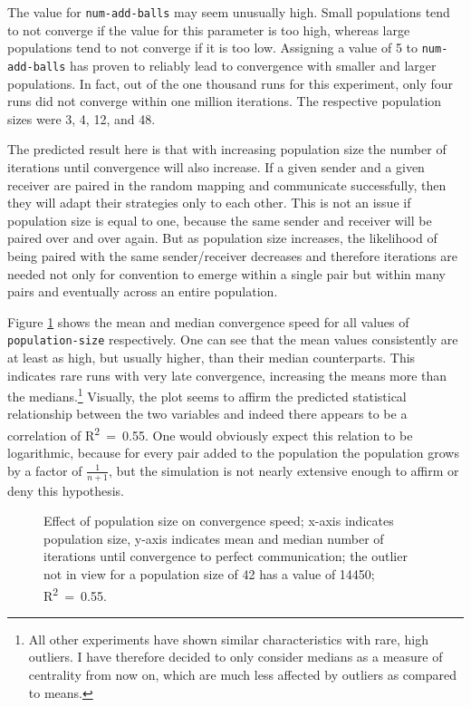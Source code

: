 \documentclass[
	DIV=calc,
	BCOR=0mm,
	pagesize,
]{scrartcl}
\newcommand{\code}[1]{\texttt{#1}}
\begin{document}
The value for \code{num-add-balls} may seem unusually high.
Small populations tend to not converge if the value for this parameter is too high, whereas large populations tend to not converge if it is too low.
Assigning a value of 5 to \code{num-add-balls} has proven to reliably lead to convergence with smaller and larger populations.
In fact, out of the one thousand runs for this experiment, only four runs did not converge within one million iterations.
The respective population sizes were 3, 4, 12, and 48.

The predicted result here is that with increasing population size the number of iterations until convergence will also increase.
If a given sender and a given receiver are paired in the random mapping and communicate successfully, then they will adapt their strategies only to each other.
This is not an issue if population size is equal to one, because the same sender and receiver will be paired over and over again.
But as population size increases, the likelihood of being paired with the same sender/receiver decreases and therefore iterations are needed not only for convention to emerge within a single pair but within many pairs and eventually across an entire population.

Figure \ref{fig:pop} shows the mean and median convergence speed for all values of \code{population-size} respectively.
One can see that the mean values consistently are at least as high, but usually higher, than their median counterparts.
This indicates rare runs with very late convergence, increasing the means more than the medians.\footnote{All other experiments have shown similar characteristics with rare, high outliers. I have therefore decided to only consider medians as a measure of centrality from now on, which are much less affected by outliers as compared to means.}
Visually, the plot seems to affirm the predicted statistical relationship between the two variables and indeed there appears to be a correlation of R\textsuperscript{2}~=~0.55.
One would obviously expect this relation to be logarithmic, because for every pair added to the population the population grows by a factor of \(\frac{1}{n+1}\), but the simulation is not nearly extensive enough to affirm or deny this hypothesis.

\begin{figure}
	\centering
	\caption{Effect of population size on convergence speed; x-axis indicates population size, y-axis indicates mean and median number of iterations until convergence to perfect communication; the outlier not in view for a population size of 42 has a value of 14450; R\textsuperscript{2}~=~0.55.}
	\label{fig:pop}
\end{figure}
\end{document}

